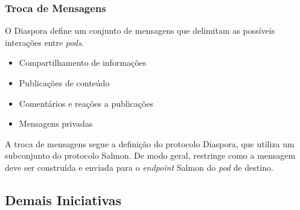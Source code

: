 \subsubsection{Troca de Mensagens}

O Diaspora define um conjunto de mensagens que delimitam as possíveis interações 
entre \textit{pods}.

\begin{itemize}
  \item{Compartilhamento de informações}
  \item{Publicações de conteúdo}
  \item{Comentários e reações a publicações}
  \item{Mensagens privadas}
\end{itemize}

A troca de mensagens segue a definição do protocolo Diaspora, que utiliza um
subconjunto do protocolo Salmon. De modo geral, restringe como a mensagem deve ser
construída e enviada para o \textit{endpoint} Salmon do \textit{pod} de destino. 

\subsection{Demais Iniciativas}

